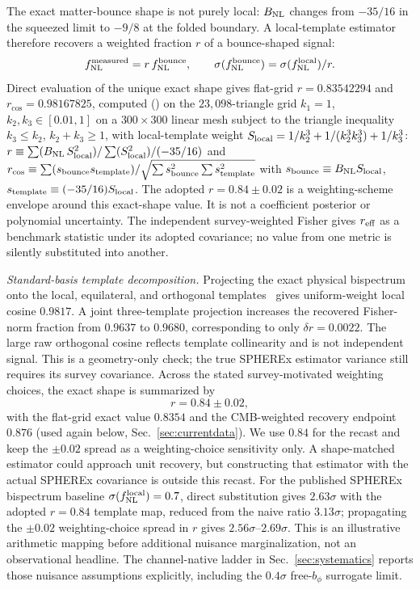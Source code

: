 \documentclass[aps,prd,twocolumn,superscriptaddress,showpacs,preprintnumbers,nofootinbib,longbibliography,floatfix]{revtex4-2}
\newcommand{\fnl}{f_{\rm NL}}
\newcommand{\BNL}{B_{\rm NL}}
\begin{document}
The exact matter-bounce shape is not purely local: $\BNL$ changes from $-35/16$ in the squeezed limit to $-9/8$ at the folded boundary. A local-template estimator therefore recovers a weighted fraction $r$ of a bounce-shaped signal:
\begin{equation}
\fnl^{\rm measured}=r\,\fnl^{\rm bounce},\qquad
\sigma(\fnl^{\rm bounce})=\sigma(\fnl^{\rm local})/r .
\label{eq:projection}
\end{equation}
Direct evaluation of the unique exact shape gives flat-grid $r=0.83542294$ and $r_{\cos}=0.98167825$, computed () on the $23{,}098$-triangle grid $k_1=1$, $k_2,k_3\in[0.01,1]$ on a $300\times300$ linear mesh subject to the triangle inequality $k_3\le k_2$, $k_2+k_3\ge1$, with local-template weight $S_{\rm local}=1/k_2^3+1/(k_2^3k_3^3)+1/k_3^3$: $r\equiv\sum(\BNL\,S_{\rm local}^2)/\sum(S_{\rm local}^2)/(-35/16)$ and $r_{\cos}\equiv\sum(s_{\rm bounce}s_{\rm template})/\sqrt{\sum s_{\rm bounce}^2\sum s_{\rm template}^2}$ with $s_{\rm bounce}\equiv\BNL S_{\rm local}$, $s_{\rm template}\equiv(-35/16)S_{\rm local}$. The adopted $r=0.84\pm0.02$ is a weighting-scheme envelope around this exact-shape value. It is not a coefficient posterior or polynomial uncertainty. The independent survey-weighted Fisher gives $r_{\rm eff}$ as a benchmark statistic under its adopted covariance; no value from one metric is silently substituted into another.
\par \emph{Standard-basis template decomposition.} Projecting the exact physical bispectrum onto the local, equilateral, and orthogonal templates~\cite{Senatore:2010} gives uniform-weight local cosine $0.9817$. A joint three-template projection increases the recovered Fisher-norm fraction from $0.9637$ to $0.9680$, corresponding to only $\delta r=0.0022$. The large raw orthogonal cosine reflects template collinearity and is not independent signal. This is a geometry-only check; the true SPHEREx estimator variance still requires its survey covariance.
Across the stated survey-motivated weighting choices, the exact shape is summarized by
\begin{equation}
r=0.84\pm0.02 ,
\label{eq:r_noise}
\end{equation}
with the flat-grid exact value $0.8354$ and the CMB-weighted recovery endpoint $0.876$ (used again below, Sec.~\ref{sec:currentdata}). We use $0.84$ for the recast and keep the $\pm0.02$ spread as a weighting-choice sensitivity only. A shape-matched estimator could approach unit recovery, but constructing that estimator with the actual SPHEREx covariance is outside this recast.
For the published SPHEREx bispectrum baseline $\sigma(\fnl^{\rm local})=0.7$, direct substitution gives $2.63\sigma$ with the adopted $r=0.84$ template map, reduced from the naive ratio $3.13\sigma$; propagating the $\pm0.02$ weighting-choice spread in $r$ gives $2.56\sigma$--$2.69\sigma$. This is an illustrative arithmetic mapping before additional nuisance marginalization, not an observational headline. The channel-native ladder in Sec.~\ref{sec:systematics} reports those nuisance assumptions explicitly, including the $0.4\sigma$ free-$b_\phi$ surrogate limit.
\end{document}
